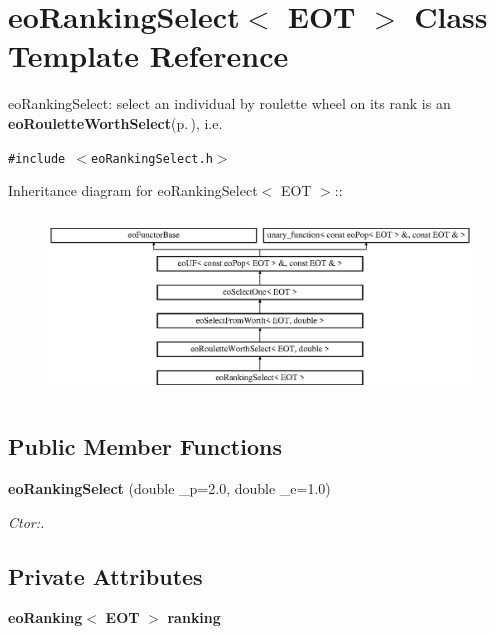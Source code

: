 \section{eo\-Ranking\-Select$<$ EOT $>$ Class Template Reference}
\label{classeo_ranking_select}
eo\-Ranking\-Select: select an individual by roulette wheel on its rank is an {\bf eo\-Roulette\-Worth\-Select}{\rm (p.\,\pageref{classeo_roulette_worth_select})}, i.e.  


{\tt \#include $<$eo\-Ranking\-Select.h$>$}

Inheritance diagram for eo\-Ranking\-Select$<$ EOT $>$::\begin{figure}[H]
\begin{center}
\leavevmode
\includegraphics[height=4.85549cm]{classeo_ranking_select}
\end{center}
\end{figure}
\subsection*{Public Member Functions}
\begin{CompactItemize}
\item 
{\bf eo\-Ranking\-Select} (double \_\-p=2.0, double \_\-e=1.0)
\begin{CompactList}\small\item\em Ctor:. \item\end{CompactList}\end{CompactItemize}
\subsection*{Private Attributes}
\begin{CompactItemize}
\item 
{\bf eo\-Ranking}$<$ {\bf EOT} $>$ {\bf ranking}\label{classeo_ranking_select_r0}

\end{CompactItemize}


